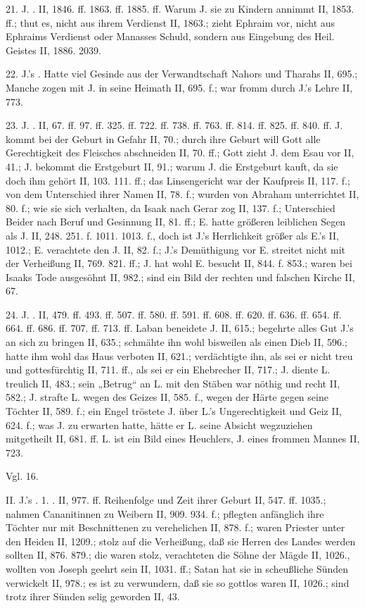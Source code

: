 21. J. . II, 1846. ff. 1863. ff. 1885. ff. Warum J. sie zu Kindern annimmt II, 1853. ff.; thut es, nicht aus ihrem Verdienst II, 1863.; zieht Ephraim vor, nicht aus Ephraims Verdienst oder Manasses Schuld, sondern aus Eingebung des Heil. Geistes II, 1886. 2039.

22. J.’s . Hatte viel Gesinde aus der Verwandtschaft Nahors und Tharahs II, 695.; Manche zogen mit J. in seine Heimath II, 695. f.; war fromm durch J.’s Lehre II, 773.

23. J. . II, 67. ff. 97. ff. 325. ff. 722. ff. 738. ff. 763. ff. 814. ff. 825. ff. 840. ff. J. kommt bei der Geburt in Gefahr II, 70.; durch ihre Geburt will Gott alle Gerechtigkeit des Fleisches abschneiden II, 70. ff.; Gott zieht J. dem Esau vor II, 41.; J. bekommt die Erstgeburt II, 91.; warum J. die Erstgeburt kauft, da sie doch ihm gehört II, 103. 111. ff.; das Linsengericht war der Kaufpreis II, 117. f.; von dem Unterschied ihrer Namen II, 78. f.; wurden von Abraham unterrichtet II, 80. f.; wie sie sich verhalten, da Isaak nach Gerar zog II, 137. f.; Unterschied Beider nach Beruf und Gesinnung II, 81. ff.; E. hatte größeren leiblichen Segen als J. II, 248. 251. f. 1011. 1013. f., doch ist J.’s Herrlichkeit größer als E.’s II, 1012.; E. verachtete den J. II, 82. f.; J.’s Demüthigung vor E. streitet nicht mit der Verheißung II, 769. 821. ff.; J. hat wohl E. besucht II, 844. f. 853.; waren bei Isaaks Tode ausgesöhnt II, 982.; sind ein Bild der rechten und falschen Kirche II, 67.

24. J. . II, 479. ff. 493. ff. 507. ff. 580. ff. 591. ff. 608. ff. 620. ff. 636. ff. 654. ff. 664. ff. 686. ff. 707. ff. 713. ff. Laban beneidete J. II, 615.; begehrte alles Gut J.’s an sich zu bringen II, 635.; schmähte ihn wohl bisweilen als einen Dieb II, 596.; hatte ihm wohl das Haus verboten II, 621.; verdächtigte ihn, als sei er nicht treu und gottesfürchtig II, 711. ff., als sei er ein Ehebrecher II, 717.; J. diente L. treulich II, 483.; sein „Betrug“ an L. mit den Stäben war nöthig und recht II, 582.; J. strafte L. wegen des Geizes II, 585. f., wegen der Härte gegen seine Töchter II, 589. f.; ein Engel tröstete J. über L.’s Ungerechtigkeit und Geiz II, 624. f.; was J. zu erwarten hatte, hätte er L. seine Absicht wegzuziehen mitgetheilt II, 681. ff. L. ist ein Bild eines Heuchlers, J. eines frommen Mannes II, 723.

Vgl.  16.

II. J.’s . 1. . II, 977. ff. Reihenfolge und Zeit ihrer Geburt II, 547. ff. 1035.; nahmen Cananitinnen zu Weibern II, 909. 934. f.; pflegten anfänglich ihre Töchter nur mit Beschnittenen zu verehelichen II, 878. f.; waren Priester unter den Heiden II, 1209.; stolz auf die Verheißung, daß sie Herren des Landes werden sollten II, 876. 879.; die  waren stolz, verachteten die Söhne der Mägde II, 1026., wollten von Joseph geehrt sein II, 1031. ff.; Satan hat sie in scheußliche Sünden verwickelt II, 978.; es ist zu verwundern, daß sie so gottlos waren II, 1026.; sind trotz ihrer Sünden selig geworden II, 43.

